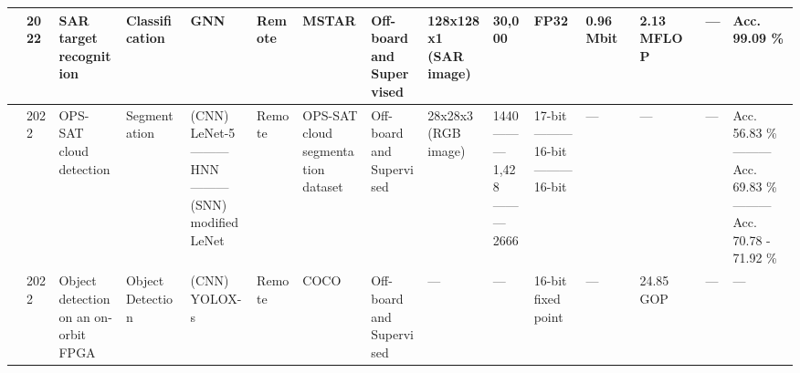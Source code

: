 \begin{center}
{\begin{tabular}{lllllllllllllll}
\cite{zhangAccurateLowlatencyEfficient2022} & 2022 & \makecell[tl]{SAR target\\ recognition} & Classification & GNN & Remote & MSTAR & \makecell[tl]{Off-board\\ and\\ Supervised} & \makecell[tl]{128x128x1\\ (SAR image)} & 30,000 & FP32 & 0.96 Mbit & 2.13 MFLOP & --- & Acc. 99.09 \% \\ \hline
\cite{abderrahmaneSPLEATSPikingLowpower2022} & 2022 & \makecell[tl]{OPS-SAT cloud\\ detection} & Segmentation & \makecell[tl]{(CNN)\\ LeNet-5\\ ---------\\ HNN\\ ---------\\ (SNN)\\ modified LeNet} & Remote & \makecell[tl]{OPS-SAT cloud\\ segmentation\\ dataset} & \makecell[tl]{Off-board\\ and\\ Supervised} & \makecell[tl]{28x28x3\\ (RGB image)} & \makecell[tl]{1440\\ ---------\\ 1,428\\ ---------\\ 2666} & \makecell[tl]{17-bit\\ ---------\\ 16-bit\\ ---------\\ 16-bit} & --- & --- & --- & \makecell[tl]{Acc. 56.83 \%\\ ---------\\ Acc. 69.83 \%\\ ---------\\ Acc.\\ 70.78 - 71.92 \%}  \\ \hline
\cite{wangHardwareAccelerationImplementation2022} & 2022 & \makecell[tl]{Object\\ detection\\ on an on-orbit\\ FPGA} & \makecell[tl]{Object\\ Detection} & \makecell[tl]{(CNN)\\ YOLOX-s} & Remote & COCO~\cite{linMicrosoftCOCOCommon2014} & \makecell[tl]{Off-board\\ and\\ Supervised} & --- & --- & \makecell[tl]{16-bit\\ fixed point} & --- & 24.85 GOP & --- & --- \\ \hline

\end{tabular}}
\end{center}
